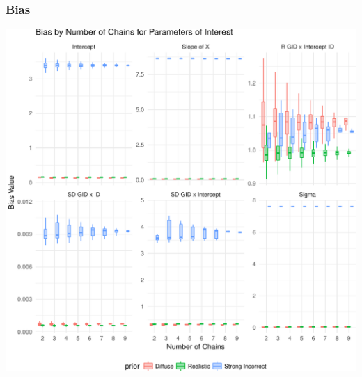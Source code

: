 \documentclass{beamer}
\begin{document}
\begin{frame}
	\frametitle{Bias}
	\begin{center}
	\includegraphics[scale=.45]{Box_bias.pdf}
	\end{center}
\end{frame}
\end{document}
